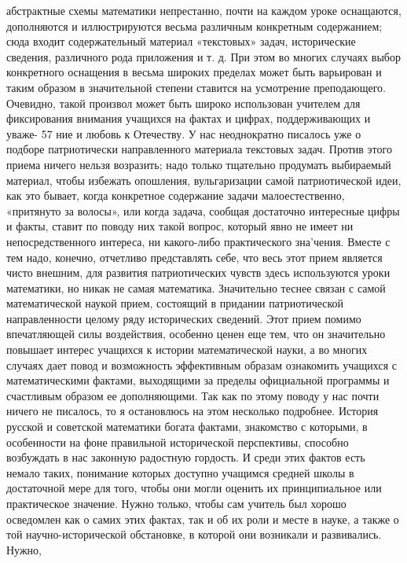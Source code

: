 \documentclass[12pt, a4paper, openany]{book}
\begin{document}
абстрактные схемы математики непрестанно, почти на  
каждом уроке оснащаются, дополняются и иллюстрируются 
весьма различным конкретным содержанием; сюда входит 
содержательный материал «текстовых» задач,  
исторические сведения, различного рода приложения и т. д. При 
этом во многих случаях выбор конкретного оснащения в 
весьма широких пределах может быть варьирован и таким 
образом в значительной степени ставится на усмотрение 
преподающего. Очевидно, такой произвол может быть  
широко использован учителем для фиксирования внимания 
учащихся на фактах и цифрах, поддерживающих и уваже- 
57 
ние и любовь к Отечеству. У нас неоднократно писалось 
уже о подборе патриотически направленного материала 
текстовых задач. Против этого приема ничего нельзя  
возразить; надо только тщательно продумать выбираемый 
материал, чтобы избежать опошления, вульгаризации самой 
патриотической идеи, как это бывает, когда конкретное 
содержание задачи малоестественно, «притянуто за  
волосы», или когда задача, сообщая достаточно интересные 
цифры и факты, ставит по поводу них такой вопрос,  
который явно не имеет ни непосредственного интереса, ни  
какого-либо практического зна'чения. Вместе с тем надо, 
конечно, отчетливо представлять себе, что весь этот прием 
является чисто внешним, для развития патриотических 
чувств здесь используются уроки математики, но никак 
не самая математика. 
Значительно теснее связан с самой математической 
наукой прием, состоящий в придании патриотической  
направленности целому ряду исторических сведений. Этот 
прием помимо впечатляющей силы воздействия, особенно 
ценен еще тем, что он значительно повышает интерес  
учащихся к истории математической науки, а во многих  
случаях дает повод и возможность эффективным образам 
ознакомить учащихся с математическими фактами,  
выходящими за пределы официальной программы и счастливым 
образом ее дополняющими. Так как по этому поводу у 
нас почти ничего не писалось, то я остановлюсь на этом 
несколько подробнее. 
История русской и советской математики богата  
фактами, знакомство с которыми, в особенности на фоне  
правильной исторической перспективы, способно возбуждать в нас 
законную радостную гордость. И среди этих фактов есть 
немало таких, понимание которых доступно учащимся 
средней школы в достаточной мере для того, чтобы они 
могли оценить их принципиальное или практическое 
значение. Нужно только, чтобы сам учитель был хорошо 
осведомлен как о самих этих фактах, так и об их роли 
и месте в науке, а также о той научно-исторической  
обстановке, в которой они возникали и развивались. Нужно, 
\end{document}

